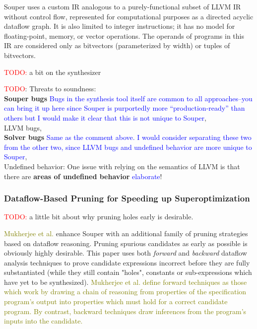 \documentclass[12pt,twoside]{reedthesis}
\newcommand{\red}[1]{\textcolor{red}{#1}}
\newcommand{\green}[1]{\textcolor{olive}{#1}}
\newcommand{\comment}[2]{\textbf{#1} \textcolor{blue}{#2}}
\newcommand{\addressed}[2]{{#1}}
\begin{document}
Souper uses a custom IR analogous to a purely-functional subset of LLVM IR without control flow\footnotemark, represented for computational purposes as a directed acyclic dataflow graph.
It is also limited to integer instructions; it has no model for floating-point, memory, or vector operations.
The operands of programs in this IR are considered only as bitvectors (parameterized by width) or tuples of bitvectors.

    
    \red{TODO:} a bit on the synthesizer
    
    \red{TODO}: Threats to soundness:
     \\ \comment{Souper bugs}{Bugs in the synthesis tool itself are common to all approaches--you can bring it up here since Souper is purportedly more ``production-ready'' than others but I would make it clear that this is not unique to Souper},
     \\ LLVM bugs,
     \\ \comment{Solver bugs}{Same as the comment above. I would consider separating these two from the other two, since LLVM bugs and undefined behavior are more unique to Souper},
     \\ Undefined behavior: One issue with relying on the semantics of LLVM is that there are \comment{areas of undefined behavior}{elaborate}!

\subsubsection{Dataflow-Based Pruning for Speeding up Superoptimization}
    \red{TODO:} a little bit about why pruning holes early is desirable.

\green{Mukherjee et al.} \cite{mukherjee2020dataflow} enhance Souper with an additional family of pruning strategies based on dataflow reasoning. 
Pruning spurious candidates as early as possible is obviously highly desirable.
This paper uses both \textit{forward} and \textit{backward} dataflow analysis techniques to prove candidate expressions incorrect before they are fully substantiated (while they still contain "holes", constants or sub-expressions which have yet to be synthesized).
\green{
Mukherjee et al. define forward techniques as those which work by drawing a chain of reasoning from properties of the specification program's output into properties which must hold for a correct candidate program.
By contrast, backward techniques draw inferences from the program's inputs into the candidate.
}
\end{document}
